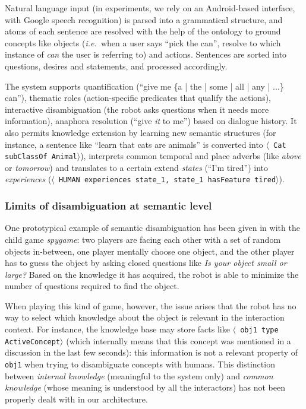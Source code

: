 \documentclass[preprint,5p]{elsarticle}
\newcommand{\concept}[1]{{\small \texttt{#1}}}
\newcommand{\stmt}[1]{{\footnotesize \tt $\langle$ #1\relax$\rangle$}}
\newcommand{\ie}{{\textit{i.e.\ }}}
\begin{document}
Natural language input (in experiments, we rely on an Android-based interface,
with Google speech recognition) is parsed into a grammatical structure, and
atoms of each sentence are resolved with the help of the ontology to ground
concepts like objects (\ie when a user says ``pick the can'', resolve to which
instance of \emph{can} the user is referring to) and actions. Sentences are
sorted into questions, desires and statements, and processed accordingly.

The system supports quantification (``give me \{a | the | some | all | any |
...\} can''), thematic roles (action-specific predicates that qualify the
actions), interactive disambiguation (the robot asks questions when it needs
more information), anaphora resolution (``give \emph{it} to me'') based on
dialogue history. It also permits knowledge extension by learning new semantic
structures (for instance, a sentence like ``learn that cats are animals'' is
converted into \stmt{Cat subClassOf Animal}), interprets common temporal and
place adverbs (like \emph{above} or \emph{tomorrow}) and translates to a
certain extend \emph{states} (``I'm tired'') into \emph{experiences}
(\stmt{HUMAN experiences state\_1, state\_1 hasFeature tired}).


\subsubsection{Limits of disambiguation at semantic level}

One prototypical example of semantic disambiguation has been given in
\cite{Ros2010b} with the child game \emph{spygame}: two players are facing
each other with a set of random objects in-between, one player mentally choose
one object, and the other player has to guess the object by asking closed
questions like \emph{Is your object small or large?} Based on the knowledge it
has acquired, the robot is able to minimize the number of questions required to
find the object.

When playing this kind of game, however, the issue arises that the robot has no
way to select which knowledge about the object is relevant in the interaction
context. For instance, the knowledge base may store facts like \stmt{obj1 type
ActiveConcept} (which internally means that this concept was mentioned in a
discussion in the last few seconds): this information is not a relevant
property of \concept{obj1} when trying to disambiguate concepts with humans.
This distinction between \emph{internal knowledge} (meaningful to
the system only) and \emph{common knowledge} (whose meaning is understood by
all the interactors) has not been properly dealt with in our architecture.
\end{document}
